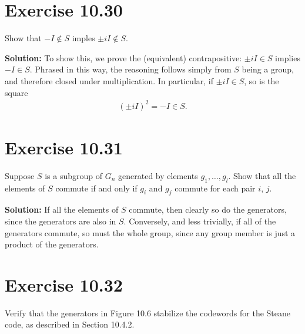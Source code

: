 \documentclass{book}
\begin{document}
\section*{Exercise 10.30}
    Show that $-I \notin S$ imples $\pm i I \notin S$.
    
    \textbf{Solution:} To show this, we prove the (equivalent) contrapositive: $\pm i I \in S$ implies $-I \in S$. Phrased in this way, the reasoning follows simply from $S$ being a group, and therefore closed under multiplication. In particular, if $\pm i I \in S$, so is the square
    \begin{align}
        (\pm i I)^2 = -I \in S.
    \end{align}

\section*{Exercise 10.31}
    Suppose $S$ is a subgroup of $G_n$ generated by elements $g_1,\dots, g_l$. Show that all the elements of $S$ commute if and only if $g_i$ and $g_j$ commute for each pair $i$, $j$.
    
    \textbf{Solution:} If all the elements of $S$ commute, then clearly so do the generators, since the generators are also in $S$. Conversely, and less trivially, if all of the generators commute, so must the whole group, since any group member is just a product of the generators.
    
\section*{Exercise 10.32}
    Verify that the generators in Figure 10.6 stabilize the codewords for the Steane code, as described in Section 10.4.2.
    
\end{document}
